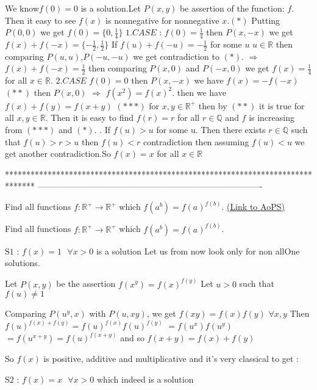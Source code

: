 \begin{solution}
	We know$\boxed{f(0)=0}$ is a solution.Let $P(x,y)$ be assertion of the function: $f$. Then it easy to see $f(x)$ is nonnegative for nonnegative $x$.$(*)$ Putting $P(0,0)$ we get $f(0)=\{0,\frac{1}{4}\}$  $1.CASE$ :   $f(0)=\frac{1}{4}$ then $P(x,-x)$ we get $ f(x)+f(-x)=\{-\frac{1}{2},\frac{1}{2}\}$ If $ f(u)+f(-u)=-\frac{1}{2}$ for some $u$ $u\in\mathbb{R}$ then comparing $P(u,u)$,$P(-u,-u)$ we get contradiction to $(*)$. $\Rightarrow$ $ f(x)+f(-x)=\frac{1}{2}$ then comparing $P(x,0)$ and $P(-x,0)$ we get $\boxed{f(x)=\frac{1}{4}}$ for all $x\in\mathbb{R}$. $ 2.CASE$ $f(0)=0$ then $P(x,-x)$ we have $f(x)=-f(-x)$ $(**)$ then $P(x,0)$ $\Rightarrow$  $f(x^2)=f(x)^2.$ then we have $f(x)+f(y)=f(x+y)$ $(***)$ for $x,y\in\mathbb{R^+}$ then by $(**)$ it is true for all  $x,y\in\mathbb{R}$. Then it is easy  to find $f(r)=r$ for  all $r\in\mathbb{Q}$ and $f$ is increasing from $(***)$ and $(*).$  . If $f(u)>u$ for some u. Then there exists $r\in\mathbb{Q}$ such that $f(u)>r>u$ then $f(u)<r$ contradiction then assuming $f(u)<u$ we get another contradiction.So $\boxed{f(x)=x}$ for all $x\in\mathbb{R}$
\end{solution}
*******************************************************************************
-------------------------------------------------------------------------------

\begin{problem}
	Find all functions $f:\mathbb{R}^{+}\rightarrow \mathbb{R}^{+} $ which  $f(a^{b}) = f(a) ^{f(b)}$.
	\flushright \href{https://artofproblemsolving.com/community/c6h589660}{(Link to AoPS)}
\end{problem}



\begin{solution}
	\begin{tcolorbox}Find all functions $f:\mathbb{R}^{+}\rightarrow \mathbb{R}^{+} $ which  $f(a^{b}) = f(a) ^{f(b)}$.\end{tcolorbox}
$\boxed{\text{S1 : }f(x)=1\text{  }\forall x>0}$  is a solution
Let us from now look only for non allOne solutions.

Let $P(x,y)$ be the assertion $f(x^y)=f(x)^{f(y)}$
Let $u>0$ such that $f(u)\ne 1$

Comparing $P(u^y,x)$ with $P(u,xy)$, we get $f(xy)=f(x)f(y)$ $\forall x,y$
Then $f(u)^{f(x)+f(y)}=f(u)^{f(x)}f(u)^{f(y)}$ $=f(u^x)f(u^y)$ $=f(u^{x+y})=f(u)^{f(x+y)}$ and so $f(x+y)=f(x)+f(y)$

So $f(x)$ is positive, additive and multiplicative and it's very classical to get :

$\boxed{\text{S2 : }f(x)=x\text{  }\forall x>0}$  which indeed is a solution
\end{solution}



